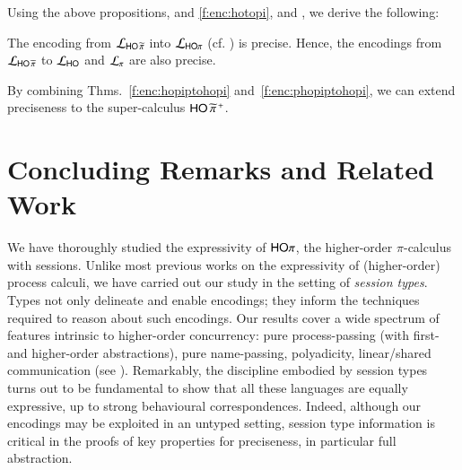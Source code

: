 \documentclass[runningheads]{llncs}
\begin{document}
{%
Using the above propositions,  
and 
\ref{f:enc:hotopi},
and , 
we derive the following: 
\begin{theorem}
	\label{f:enc:phopiptohopi}
	The encoding from
		$\mathcal{L}_{\mathsf{HO}\,{\widetilde{\pi}}}$ into $\mathcal{L}_{\mathsf{HO}\pi}$ (cf. )
	is precise. 
	Hence, the encodings 
	from
	$\mathcal{L}_{\mathsf{HO}\,{\widetilde{\pi}}}$ to $\mathcal{L}_{\mathsf{HO}}$ 
	and $\mathcal{L}_{\pi}$ 
	are also precise. 
\end{theorem}
By combining Thms.~\ref{f:enc:hopiptohopi} and~\ref{f:enc:phopiptohopi},
we can extend preciseness to the super-calculus
$\mathsf{HO}\,{\widetilde{\pi}}^{\,+}$.







\section{Concluding Remarks and Related Work}
\label{sec:relwork}
%

We have thoroughly studied the expressivity of $\mathsf{HO}\pi$, the higher-order $\pi$-calculus with sessions.
Unlike most previous works on the expressivity of 
(higher-order) process calculi, we have carried out our study in the setting of \emph{session types}. %
Types not only delineate and enable encodings; they 
inform the techniques required to reason about such encodings.
Our results cover a wide spectrum of features intrinsic to higher-order concurrency:
pure process-passing (with first- and higher-order abstractions), pure name-passing, polyadicity, 
linear/shared communication (see ). 
Remarkably, the discipline embodied by 
session types turns out to be fundamental to show that all these languages are equally expressive, up to 
 strong behavioural correspondences. Indeed, although our encodings may be exploited in an untyped setting,
session type information is critical in the proofs of key properties for preciseness, in particular full abstraction.

}
\end{document}
